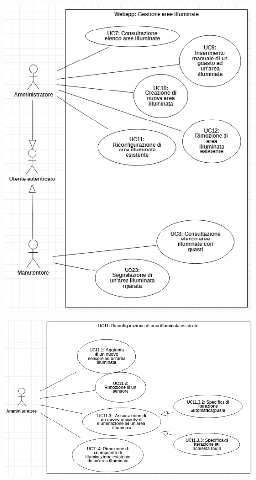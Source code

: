 \documentclass[a4paper, 12pt]{article}
\begin{document}
\includegraphics[scale=0.7]{diagramma_use_case_8.png}

\includegraphics[scale=0.7]{diagramma_use_case_9.png}
\end{document}
